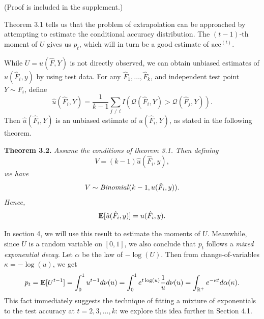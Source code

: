 \documentclass[12pt]{article}
\begin{document}
(Proof is included in the supplement.)


Theorem 3.1 tells us that the problem of extrapolation can be
approached by attempting to estimate the conditional accuracy
distribution.  The $(t-1)$-th moment of $U$ gives us $p_t$, which will
in turn be a good estimate of $\text{acc}^{(t)}$.

While $U = u(\hat{F}, Y)$ is not directly observed, we can obtain unbiased estimates of $u(\hat{F}_i, y)$
by using test data.  For any $\hat{F}_1,\hdots, \hat{F}_k$, and independent test point $Y \sim F_i$, define
\begin{equation}\label{eq:hatu}
\hat{u}(\hat{F}_i, Y) = \frac{1}{k -1}\sum_{j \neq i} I(\mathcal{Q}(\hat{F}_i, Y) > \mathcal{Q}(\hat{F}_j, Y)).
\end{equation}
Then $\hat{u}(\hat{F}_i, Y)$ is an unbiased estimate of $u(\hat{F}_i, Y)$, as stated in the following theorem.

\noindent\textbf{Theorem 3.2.}\emph{
Assume the conditions of theorem 3.1.
Then defining 
\begin{equation}\label{eq:veq}
V = (k-1)\hat{u}(\hat{F}_i, y),\end{equation}
we have
\[V \sim \text{\emph{Binomial}}(k-1, u(\hat{F}_i, y)).\]
Hence,
\[\textbf{E}[\hat{u}(\hat{F}_i, y)] = u(\hat{F}_i, y).\]
}

In section 4, we will use this result to estimate the moments of $U$.
Meanwhile, since $U$ is a random variable on $[0, 1]$, we also conclude that $p_t$ follows a \emph{mixed exponential decay}.
Let $\alpha$ be the law of $-\log(U)$.
Then from change-of-variables $\kappa =-\log(u)$, we get
\[p_t = \textbf{E}[U^{t-1}] = 
\int_0^1 u^{t-1} d\nu(u) = \int_0^1 e^{t\log(u)} \frac{1}{u}d\nu(u) = 
\int_{\mathbb{R}^{+}} e^{-\kappa t} d\alpha(\kappa).\]
This fact immediately suggests the technique of fitting a mixture of exponentials to the test accuracy at $t =2,3,\hdots, k$:
we explore this idea further in Section 4.1.
\end{document}
